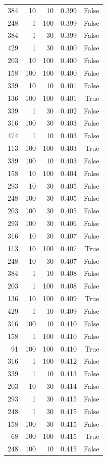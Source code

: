 \begin{tabular}{rrrrr}
384 & 10 & 10 & 0.399 & False \\
248 & 1 & 100 & 0.399 & False \\
384 & 1 & 30 & 0.399 & False \\
429 & 1 & 30 & 0.400 & False \\
203 & 10 & 100 & 0.400 & False \\
158 & 100 & 100 & 0.400 & False \\
339 & 10 & 10 & 0.401 & False \\
136 & 100 & 100 & 0.401 & True \\
339 & 1 & 30 & 0.402 & False \\
316 & 100 & 30 & 0.403 & False \\
474 & 1 & 10 & 0.403 & False \\
113 & 100 & 100 & 0.403 & True \\
339 & 100 & 10 & 0.403 & False \\
158 & 10 & 100 & 0.404 & False \\
293 & 10 & 30 & 0.405 & False \\
248 & 100 & 30 & 0.405 & False \\
203 & 100 & 30 & 0.405 & False \\
293 & 100 & 30 & 0.406 & False \\
316 & 10 & 30 & 0.407 & False \\
113 & 10 & 100 & 0.407 & True \\
248 & 10 & 30 & 0.407 & False \\
384 & 1 & 10 & 0.408 & False \\
203 & 1 & 100 & 0.408 & False \\
136 & 10 & 100 & 0.409 & True \\
429 & 1 & 10 & 0.409 & False \\
316 & 100 & 10 & 0.410 & False \\
158 & 1 & 100 & 0.410 & False \\
91 & 100 & 100 & 0.410 & True \\
316 & 1 & 100 & 0.412 & False \\
339 & 1 & 10 & 0.413 & False \\
203 & 10 & 30 & 0.414 & False \\
293 & 1 & 30 & 0.415 & False \\
248 & 1 & 30 & 0.415 & False \\
158 & 100 & 30 & 0.415 & False \\
68 & 100 & 100 & 0.415 & True \\
248 & 100 & 10 & 0.415 & False \\

\end{tabular}
